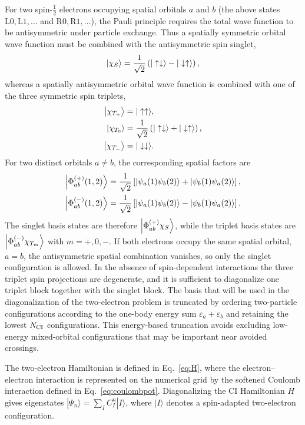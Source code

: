 \documentclass[fleqn,10pt]{wlscirep}
\begin{document}
For two spin-$\tfrac12$ electrons occupying spatial orbitals $a$ and $b$ (the above states $\mathrm{L0},\mathrm{L1},\dots$ and $\mathrm{R0},\mathrm{R1},\dots$), the Pauli principle requires the total wave function to be antisymmetric under particle exchange. Thus a spatially symmetric orbital wave function must be combined with the antisymmetric spin singlet,
\begin{equation}
  \ket{\chi_S}
  =
  \frac{1}{\sqrt{2}}
  \left(
  |\uparrow\downarrow\rangle
  -
  |\downarrow\uparrow\rangle
  \right),
\end{equation}
whereas a spatially antisymmetric orbital wave function is combined with one of the three symmetric spin triplets,
\begin{align}
  \ket{\chi_{T_+}} &= |\uparrow\uparrow\rangle,\\
  \ket{\chi_{T_0}} &=
  \frac{1}{\sqrt{2}}
  \left(
  |\uparrow\downarrow\rangle
  +
  |\downarrow\uparrow\rangle
  \right),\\
  \ket{\chi_{T_-}} &= |\downarrow\downarrow\rangle .
\end{align}
For two distinct orbitals $a\neq b$, the corresponding spatial factors are
\begin{align}
  \ket{\Phi^{(+)}_{ab}(1,2)}
  &=
  \frac{1}{\sqrt{2}}
  \left[
  \ket{\psi_a(1)\psi_b(2)}
  +
  \ket{\psi_b(1)\psi_a(2)}
  \right],
  \\
  \ket{\Phi^{(-)}_{ab}(1,2)}
  &=
  \frac{1}{\sqrt{2}}
  \left[
  \ket{\psi_a(1)\psi_b(2)}
  -
  \ket{\psi_b(1)\psi_a(2)}
  \right].
\end{align}
The singlet basis states are therefore
$\ket{\Phi^{(+)}_{ab}\chi_S}$, while the triplet basis states are
$\ket{\Phi^{(-)}_{ab}\chi_{T_m}}$ with $m=+,0,-$.  If both electrons occupy the same spatial orbital, $a=b$, the antisymmetric spatial combination vanishes, so only the singlet configuration is allowed. In the absence of spin-dependent interactions the three triplet spin projections are degenerate, and it is sufficient to diagonalize one triplet block together with the singlet block. The basis that will be used in the diagonalization of the two-electron problem is truncated by ordering two-particle configurations according to the one-body energy sum $\varepsilon_a+\varepsilon_b$ and retaining the lowest $N_{\rm CI}$ configurations.  This energy-based truncation avoids excluding low-energy mixed-orbital configurations that may be important near avoided crossings.

The two-electron Hamiltonian is defined in Eq.~\eqref{eq:H}, where the electron--electron interaction is represented on the numerical grid by the softened Coulomb interaction defined in Eq.~\eqref{eq:coulombpot}.
Diagonalizing the CI Hamiltonian $H$ gives eigenstates $|\Psi_n\rangle=\sum_I C^n_{I}|I\rangle$, where $|I\rangle$ denotes a spin-adapted two-electron configuration.
\end{document}
